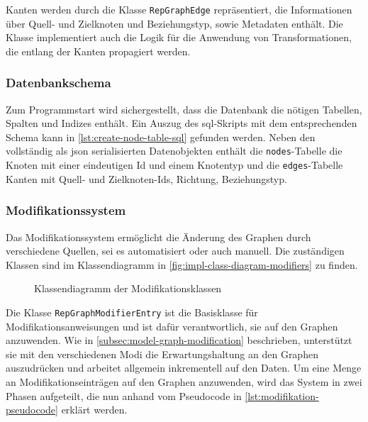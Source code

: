 Kanten werden durch die Klasse \texttt{RepGraphEdge} repräsentiert, die Informationen über Quell- und Zielknoten und Beziehungstyp, sowie Metadaten enthält.
Die Klasse implementiert auch die Logik für die Anwendung von Transformationen, die entlang der Kanten propagiert werden.


\subsubsection{Datenbankschema}

Zum Programmstart wird sichergestellt, dass die Datenbank die nötigen Tabellen, Spalten und Indizes enthält.
Ein Auszug des \acrshort{sql}-Skripts mit dem entsprechenden Schema kann in \autoref{lst:create-node-table-sql} gefunden werden.
Neben den vollständig als \acrshort{json} serialisierten Datenobjekten enthält die \texttt{nodes}-Tabelle die Knoten mit einer eindeutigen Id und einem Knotentyp und die \texttt{edges}-Tabelle Kanten mit Quell- und Zielknoten-Ids, Richtung, Beziehungstyp.



\subsubsection{Modifikationssystem}

Das Modifikationssystem ermöglicht die Änderung des Graphen durch verschiedene Quellen, sei es automatisiert oder auch manuell.
Die zuständigen Klassen sind im Klassendiagramm in \autoref{fig:impl-class-diagram-modifiers} zu finden.

\begin{figure}[htbp]
    \centering
    \makebox[\textwidth]{}
    \caption{Klassendiagramm der Modifikationsklassen}
    \label{fig:impl-class-diagram-modifiers}
\end{figure}

Die Klasse \texttt{RepGraphModifierEntry} ist die Basisklasse für Modifikationsanweisungen und ist dafür verantwortlich, sie auf den Graphen anzuwenden.
Wie in \autoref{subsec:model-graph-modification} beschrieben, unterstützt sie mit den verschiedenen Modi die Erwartungshaltung an den Graphen auszudrücken und arbeitet allgemein inkrementell auf den Daten.
Um eine Menge an Modifikationseinträgen auf den Graphen anzuwenden, wird das System in zwei Phasen aufgeteilt, die nun anhand vom Pseudocode in \autoref{lst:modifikation-pseudocode} erklärt werden.

